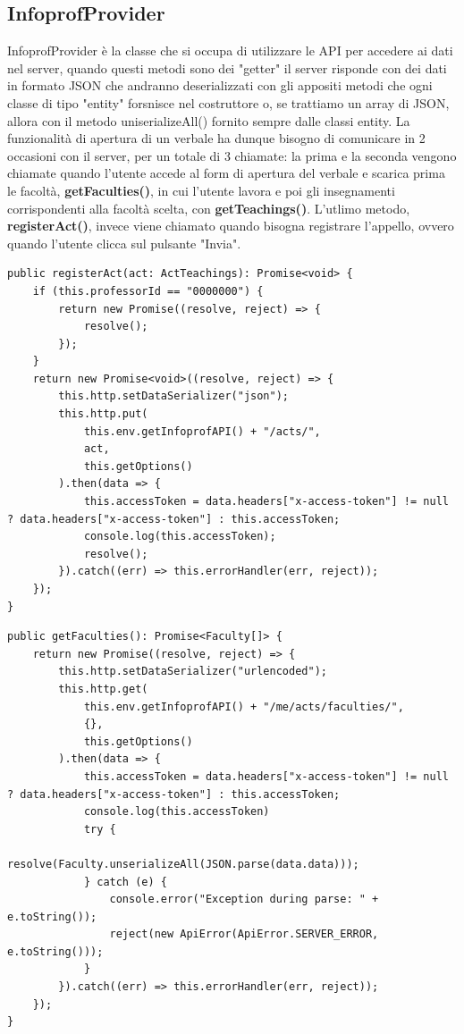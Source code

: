 \documentclass[Lau, oneside, noexaminfo]{sapthesis}%
\begin{document}
\subsection{InfoprofProvider}
InfoprofProvider è la classe che si occupa di utilizzare le API per accedere ai dati nel server, quando questi metodi sono dei "getter" il server risponde con dei dati in formato JSON che andranno deserializzati con gli appositi metodi che ogni classe di tipo "entity" forsnisce nel costruttore o, se trattiamo un array di JSON, allora con il metodo uniserializeAll() fornito sempre dalle classi entity. La funzionalità di apertura di un verbale ha dunque bisogno di comunicare in 2 occasioni con il server, per un totale di 3 chiamate: la prima e la seconda vengono chiamate quando l'utente accede al form di apertura del verbale e scarica prima le facoltà, \textbf{getFaculties()}, in cui l'utente lavora e poi gli insegnamenti corrispondenti alla facoltà scelta, con \textbf{getTeachings()}. L'utlimo metodo, \textbf{registerAct()}, invece viene chiamato quando bisogna registrare l'appello, ovvero quando l'utente clicca sul pulsante "Invia".

\begin{lstlisting}
public registerAct(act: ActTeachings): Promise<void> {
	if (this.professorId == "0000000") {
		return new Promise((resolve, reject) => {
			resolve();
		});
	}
	return new Promise<void>((resolve, reject) => {
		this.http.setDataSerializer("json");
		this.http.put(
			this.env.getInfoprofAPI() + "/acts/",
			act,
			this.getOptions()
		).then(data => {
			this.accessToken = data.headers["x-access-token"] != null ? data.headers["x-access-token"] : this.accessToken;
			console.log(this.accessToken);
			resolve();
		}).catch((err) => this.errorHandler(err, reject));
	});
}
\end{lstlisting}

\begin{lstlisting}
public getFaculties(): Promise<Faculty[]> {
	return new Promise((resolve, reject) => {
		this.http.setDataSerializer("urlencoded");
		this.http.get(
			this.env.getInfoprofAPI() + "/me/acts/faculties/",
			{},
			this.getOptions()
		).then(data => {
			this.accessToken = data.headers["x-access-token"] != null ? data.headers["x-access-token"] : this.accessToken;
			console.log(this.accessToken)
			try {
				resolve(Faculty.unserializeAll(JSON.parse(data.data)));
			} catch (e) {
				console.error("Exception during parse: " + e.toString());
				reject(new ApiError(ApiError.SERVER_ERROR, e.toString()));
			}
		}).catch((err) => this.errorHandler(err, reject));
	});
}
\end{lstlisting}
\end{document}
